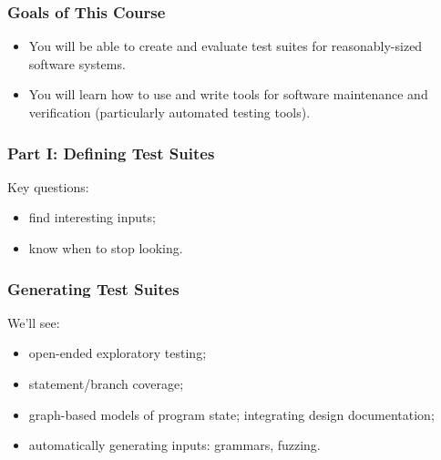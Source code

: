 \documentclass{beamer}
\newenvironment{changemargin}[1]{%
  \begin{list}{}{%
    \setlength{\topsep}{0pt}%
    \setlength{\leftmargin}{#1}%
    \setlength{\rightmargin}{1em}
    \setlength{\listparindent}{\parindent}%
    \setlength{\itemindent}{\parindent}%
    \setlength{\parsep}{\parskip}%
  }%
  \item[]}{\end{list}}
\begin{document}
\begin{frame}

  \frametitle{Goals of This Course}

    \begin{changemargin}{2em}

  \begin{itemize}

  \item You will be able to create and evaluate test suites for reasonably-sized
software systems.\\[1em]

  \item You will learn how to use and write tools for software maintenance and
verification (particularly automated testing tools).\\[1em]

  \end{itemize}
    \end{changemargin}

\end{frame}


\begin{frame}
\frametitle{Part I: Defining Test Suites}
\begin{changemargin}{2em}
\Large
Key questions:\\
\begin{itemize}
\item find interesting inputs;
\item know when to stop looking.
\end{itemize}
\end{changemargin}
\end{frame}

\begin{frame}
\frametitle{Generating Test Suites}
\begin{changemargin}{2em}
\Large
We'll see:
\begin{itemize}
\item open-ended exploratory testing;
\item statement/branch coverage;
\item graph-based models of program state; integrating design documentation;
\item automatically generating inputs: grammars, fuzzing.
\end{itemize}~\\[-1em]
\end{changemargin}
\end{frame}
\end{document}
